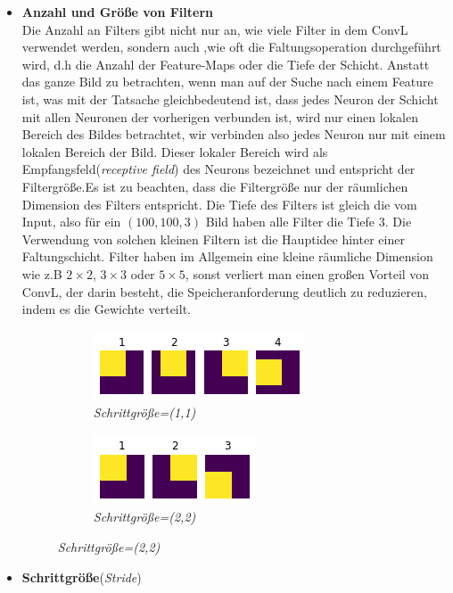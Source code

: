 \documentclass[12pt,a4paper]{scrartcl}
\numberwithin{equation}{section}
\begin{document}
\begin{itemize}
	\item \textbf{Anzahl und Größe von Filtern}\\
	Die Anzahl an Filters gibt nicht nur an, wie viele Filter in dem \ac{ConvL} verwendet werden, sondern auch ,wie oft die  Faltungsoperation durchgeführt wird, d.h die Anzahl der Feature-Maps oder die Tiefe der Schicht.
	Anstatt das ganze Bild zu betrachten, wenn man auf der Suche nach einem Feature ist, was mit der Tatsache gleichbedeutend ist, dass jedes Neuron der Schicht mit allen Neuronen der vorherigen verbunden ist, wird nur einen lokalen Bereich des Bildes betrachtet, wir verbinden also jedes Neuron nur mit einem lokalen Bereich der Bild. Dieser lokaler Bereich wird als Empfangsfeld(\emph{receptive field}) des Neurons bezeichnet und entspricht der Filtergröße.Es ist zu beachten, dass die Filtergröße nur der räumlichen Dimension des Filters entspricht. Die Tiefe des Filters ist gleich die vom Input, also für ein $ (100, 100, 3) $ Bild haben alle Filter die Tiefe $ 3 $.	
	Die Verwendung von solchen kleinen Filtern ist die Hauptidee hinter einer Faltungschicht. Filter haben im Allgemein eine kleine räumliche Dimension wie z.B $ 2\times 2 $, $3 \times3 $  oder  $5 \times 5$, sonst verliert man einen großen Vorteil von \ac{ConvL}, der darin besteht, die Speicheranforderung deutlich zu reduzieren, indem es die Gewichte verteilt.
	
	\begin{figure}[h]
		\centering
		\begin{subfigure}{.5\textwidth}
			\centering
			\includegraphics{stride1}
			\caption{\emph{Schrittgröße=(1,1) } }
			\label{fig:stride1}
		\end{subfigure}%
		\begin{subfigure}{.5\textwidth}
			\centering
			\includegraphics{stride2}
			\caption{ \emph{Schrittgröße=(2,2) } }
			\label{fig:stride2}
		\end{subfigure}
	\end{figure}
	\item  \textbf{Schrittgröße}(\emph{Stride})\\
	

\end{itemize}
\end{document}
